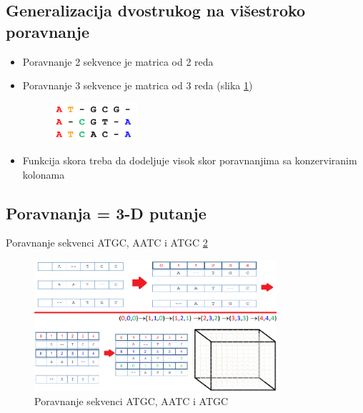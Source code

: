 \subsection{Generalizacija dvostrukog na višestroko poravnanje}
    
\begin{itemize}
    \item Poravnanje 2 sekvence je matrica od 2 reda
    \item Poravnanje 3 sekvence je matrica od 3 reda (slika  \ref{slika:poravnavanjeMatrica})
    \begin{figure}[h!]
    \centering
    \includegraphics[width=0.3\textwidth]{poglavlja/5/slike/poravnanjeMatrica.png}
    \caption{}
    \label{slika:poravnavanjeMatrica}
    \end{figure}
    \item Funkcija skora treba da dodeljuje visok skor poravnanjima sa konzerviranim kolonama
\end{itemize}



\subsection{Poravnanja = 3-D putanje}

Poravnanje sekvenci ATGC, AATC i ATGC \ref{slika:3d}

\begin{figure}[h]
\centering
\includegraphics[width=0.8\textwidth]{poglavlja/5/slike/3dPoravnanja.png}
\caption{Poravnanje sekvenci ATGC, AATC i ATGC}
\label{slika:3d}
\end{figure}

